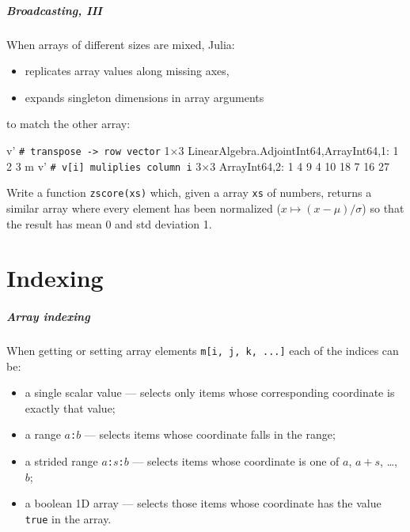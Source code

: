 \documentclass[english,serif,mathserif,xcolor=pdftex,dvipsnames,table]{beamer}
\begin{document}
\begin{frame}[fragile]
  \frametitle{Broadcasting, III}
  \small
  When arrays of different sizes are mixed, Julia:
  \begin{itemize}
  \item replicates array values along missing axes,
  \item \alert{expands singleton dimensions in array arguments}
  \end{itemize}
  to match the other array:
\begin{semiverbatim}
\julia v'  \lstinline|# transpose -> row vector|
1×3 LinearAlgebra.Adjoint{Int64,Array{Int64,1}}:
 1  2  3
\julia m  v'  \lstinline|# v[i] muliplies column i|
3×3 Array{Int64,2}:
 1   4   9
 4  10  18
 7  16  27
\end{semiverbatim}
\end{frame}


\begin{frame}
    \begin{exercise*}[4.E]
    Write a function \texttt{zscore(xs)} which, given a array
    \texttt{xs} of numbers, returns a similar array where every element
    has been normalized ($x \mapsto (x-\mu)/\sigma$) so that the
    result has mean 0 and std deviation 1.
  \end{exercise*}
\end{frame}


\part{Indexing}

\begin{frame}[fragile]
  \frametitle{Array indexing}

  When getting or setting array elements \texttt{m[i,~j,~k,~...]} each
  of the indices can be:
  \begin{itemize}
  \item a single scalar value --- selects only items whose corresponding
    coordinate is exactly that value;
  \item a range \texttt{$a$:$b$} --- selects items whose coordinate falls
    in the range;
  \item a strided range \texttt{$a$:$s$:$b$} --- selects items whose
    coordinate is one of $a$, $a+s$, \ldots, $b$;
  \item a boolean 1D array --- selects those items whose coordinate
    has the value \texttt{true} in the array.
  \end{itemize}
\end{frame}
\end{document}
